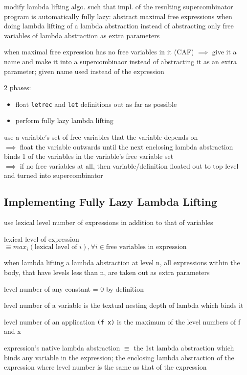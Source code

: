 \documentclass[8pt]{extarticle}
\begin{document}
\begin{multicols*}{2}
modify lambda lifting algo. such that impl. of the resulting supercombinator program is automatically fully lazy: abstract maximal free expressions when doing lambda lifting of a lambda abstraction instead of abstracting only free variables of lambda abstraction as extra parameters

when maximal free expression has no free variables in it (CAF) $\implies$ give it a name and make it into a supercombinaor instead of abstracting it as an extra parameter; given name used instead of the expression

2 phases:
\begin{itemize}
\item float \verb|letrec| and \verb|let| definitions out as far as possible
\item perform fully lazy lambda lifting
\end{itemize}

use a variable's set of free variables that the variable depends on\\
$\implies$ float the variable outwards until the next enclosing lambda abstraction binds 1 of the variables in the variable's free variable set\\
$\implies$ if no free variables at all, then variable/definition floated out to top level and turned into supercombinator

\subsection{Implementing Fully Lazy Lambda Lifting}

use lexical level number of expressions in addition to that of variables

lexical level of expression $\equiv max_i(\text{lexical level of } i), \forall i \in \text{free variables in expression}$ 

when lambda lifting a lambda abstraction at level n, all expressions within the body, that have levels less than n, are taken out as extra parameters

level number of any constant = 0 by definition

level number of a variable is the textual nesting depth of lambda which binds it

level number of an application \verb|(f x)| is the maximum of the level numbers of f and x

expression's native lambda abstraction $\equiv$ the 1st lambda abstraction which binds any variable in the expression; the enclosing lambda abstraction of the expression where level number is the same as that of the expression


\end{multicols*}
\end{document}
